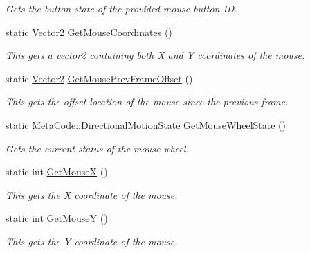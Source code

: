\begin{DoxyCompactItemize}
\begin{DoxyCompactList}\small\item\em Gets the button state of the provided mouse button ID. \item\end{DoxyCompactList}\item 
static \hyperlink{classphys_1_1Vector2}{Vector2} \hyperlink{classphys_1_1InputQueryTool_affd9523f67b542b208e6d36c3395e72b}{GetMouseCoordinates} ()
\begin{DoxyCompactList}\small\item\em This gets a vector2 containing both X and Y coordinates of the mouse. \item\end{DoxyCompactList}\item 
static \hyperlink{classphys_1_1Vector2}{Vector2} \hyperlink{classphys_1_1InputQueryTool_aea2da0aeb97353f9d7af75f2a8cb7d91}{GetMousePrevFrameOffset} ()
\begin{DoxyCompactList}\small\item\em This gets the offset location of the mouse since the previous frame. \item\end{DoxyCompactList}\item 
static \hyperlink{classphys_1_1MetaCode_ad6ed6266b5f4219a6f5da29ebe018757}{MetaCode::DirectionalMotionState} \hyperlink{classphys_1_1InputQueryTool_aa214535768fa838ad9799d3e5ca3cece}{GetMouseWheelState} ()
\begin{DoxyCompactList}\small\item\em Gets the current status of the mouse wheel. \item\end{DoxyCompactList}\item 
static int \hyperlink{classphys_1_1InputQueryTool_a1df560487b85fcb90fd9294f3009eee6}{GetMouseX} ()
\begin{DoxyCompactList}\small\item\em This gets the X coordinate of the mouse. \item\end{DoxyCompactList}\item 
static int \hyperlink{classphys_1_1InputQueryTool_a5cab535728ba864a83e7c374cc683d0b}{GetMouseY} ()
\begin{DoxyCompactList}\small\item\em This gets the Y coordinate of the mouse. \item\end{DoxyCompactList}\item 

\end{DoxyCompactItemize}
